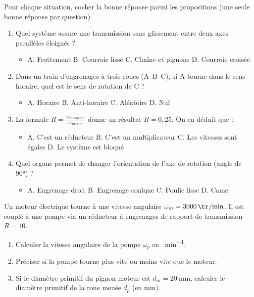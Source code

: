 \documentclass[11pt]{article}
\begin{document}
\begin{exercice}
Pour chaque situation, cocher la bonne réponse parmi les propositions (une seule bonne réponse par question).
\begin{enumerate}
    \item Quel système assure une transmission sans glissement entre deux axes parallèles éloignés ?
    \begin{itemize}
        \item[] A. Frottement \quad B. Courroie lisse \quad C. Chaîne et pignons \quad D. Courroie croisée
    \end{itemize}
    \item Dans un train d'engrenages à trois roues (A--B--C), si A tourne dans le sens horaire, quel est le sens de rotation de C ?
    \begin{itemize}
        \item[] A. Horaire \quad B. Anti-horaire \quad C. Aléatoire \quad D. Nul
    \end{itemize}
    \item La formule $R = \frac{\omega_{\text{entraînant}}}{\omega_{\text{entraîné}}}$ donne un résultat $R = 0,25$. On en déduit que :
    \begin{itemize}
        \item[] A. C'est un réducteur \quad B. C'est un multiplicateur \quad C. Les vitesses sont égales \quad D. Le système est bloqué
    \end{itemize}
    \item Quel organe permet de changer l'orientation de l'axe de rotation (angle de 90°) ?
    \begin{itemize}
        \item[] A. Engrenage droit \quad B. Engrenage conique \quad C. Poulie lisse \quad D. Came
    \end{itemize}
\end{enumerate}
\end{exercice}

\begin{exercice}
Un moteur électrique tourne à une vitesse angulaire $\omega_m = \SI{3000}{\tr\per\minute}$. Il est couplé à une pompe via un réducteur à engrenages de rapport de transmission $R = 10$.
\begin{enumerate}
    \item Calculer la vitesse angulaire de la pompe $\omega_p$ en \si{\tr\per\minute}.
    \item Préciser si la pompe tourne plus vite ou moins vite que le moteur.
    \item Si le diamètre primitif du pignon moteur est $d_m = \SI{20}{\milli\meter}$, calculer le diamètre primitif de la roue menée $d_p$ (en mm).
\end{enumerate}
\end{exercice}
\end{document}

